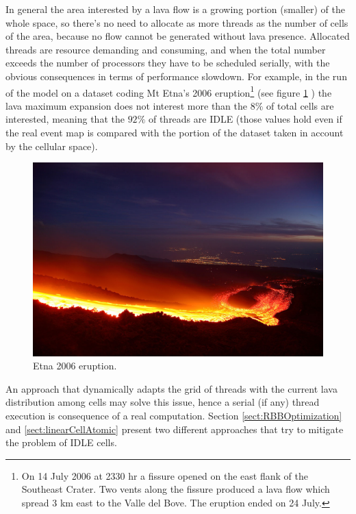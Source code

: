 In general the area interested by a lava flow is a growing portion (smaller) of
the whole space, so there's no need to allocate as more threads as the number of
cells of the area, because no flow cannot be generated without lava presence.
Allocated threads are resource demanding and consuming, and when the total
number exceeds the number of processors they have to be scheduled serially, with
the obvious consequences in terms of performance slowdown.
For example, in the run of the model on a dataset coding Mt Etna's 2006
eruption\footnote{On 14 July 2006 at 2330 hr a fissure opened on the east flank
of the Southeast Crater. Two vents along the fissure produced a lava flow which
spread 3 km east to the Valle del Bove. The eruption ended on 24 July.} (see
figure \ref{fig:etnaEruption1} ) the lava maximum expansion does not interest
more than the \(8\%\) of total cells are interested, meaning that the \(92\%\)
of threads are IDLE (those values hold even if the real event map is compared
with the portion of the dataset taken in account by the cellular space).
\begin{figure}
\begin{center}
  \includegraphics[scale=1.50]{./images/etna2006PictureEruption1}
  \caption{Etna 2006 eruption.}
  \label{fig:etnaEruption1}
\end{center}
\end{figure}

An approach that dynamically adapts the grid of threads with the current lava
distribution among cells may solve this issue, hence a serial (if any) thread
execution is consequence of a real computation. Section
\ref{sect:RBBOptimization} and \ref{sect:linearCellAtomic}  present two
 different approaches that try to mitigate the problem of IDLE cells.

